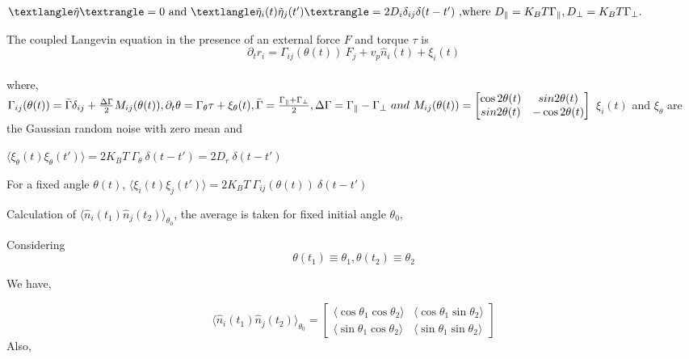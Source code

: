 \documentclass[]{article}
\begin{document}
$⟨\tilde \eta⟩ = 0 \text{  and  } \\ \\⟨\tilde \eta_i (t) \tilde \eta_j (t^\prime )⟩ = 2D_i \delta_{ij} \delta(t - t^\prime) \text{ ,where  } D_{\parallel} = K_BT \Gamma_{\parallel},D_{\perp} = K_BT \Gamma_{\perp}.$
\newline

The coupled Langevin equation in the presence of an external force $F$ and torque $\tau$ is 
\begin{equation}
\partial_t r_i = \Gamma_{ij} (\theta (t)) \  F_j + v_p \hat n_i (t) + \xi _i(t)    
\end{equation}
\\where,
\\$\Gamma_{ij}(\theta (t)) = \bar\Gamma \delta_{ij} + \frac{\Delta \Gamma}{2} M_{ij} (\theta(t))
,\partial_t \theta = \Gamma_{\theta} \tau + \xi_{\theta}(t),\\
\bar \Gamma = \frac{\Gamma_{\parallel} +\Gamma_{\perp}}{2}, \Delta \Gamma = \Gamma_{\parallel} -\Gamma_{\perp} \  and \ M_{ij} (\theta(t)) =
\begin{bmatrix}
 \cos 2\theta(t) & sin 2\theta(t)\\
  sin 2\theta(t) & -\cos 2\theta(t)
\end{bmatrix}
  $
\newpage
$\xi_i(t)$ and $\xi_{\theta}$ are the Gaussian random noise with zero mean and
\newline

$\langle \xi_{\theta}(t) \xi_{\theta}(t\prime) \rangle = 2 K_B T \ \Gamma_{\theta} \ \delta(t-t\prime)= 2 D_r \ \delta(t-t\prime)$
\newline

For a fixed angle $\theta (t)$,
$\langle \xi_i(t) \xi_j(t\prime) \rangle = 2 K_B T \ \Gamma_{ij}(\theta (t)) \ \delta(t-t\prime)$
\newline

Calculation of
$\langle \hat n_i (t_1) \hat n_j (t_2) \rangle _{\theta_0}$, the
average is taken for fixed initial angle $\theta_0$,

Considering $$\theta(t_1)\equiv \theta_1,\theta(t_2)\equiv \theta_2$$

We have, 

$$\langle \hat n_i (t_1) \hat n_j (t_2) \rangle_{\theta_0} =\begin{bmatrix}
  \langle \cos \theta_1 \cos \theta_2 \rangle & \langle \cos \theta_1 \sin \theta_2\rangle\\
  \langle \sin \theta_1 \cos \theta_2 \rangle & \langle \sin \theta_1 \sin \theta_2\rangle
\end{bmatrix}$$
Also,
\end{document}
